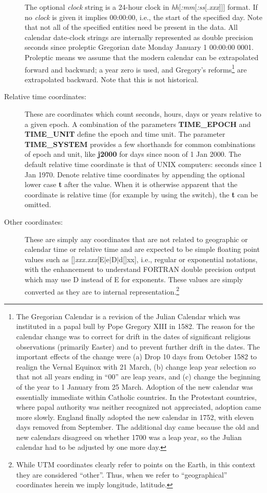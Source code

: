 \begin{description}
The optional \emph{clock} string is a 24-hour clock in \emph{hh}[\emph{:mm}[\emph{:ss}[\emph{.xxx}]]] format.
If no \emph{clock} is given
it implies 00:00:00, i.e., the start of the specified day.
Note that not all of the specified entities need be present in the data.  All calendar date-clock strings are internally represented as double precision seconds since
proleptic Gregorian date Monday January 1 00:00:00 0001.  Proleptic means we assume that the modern calendar
can be extrapolated forward and backward; a year zero is used, and Gregory's reforms\footnote{The Gregorian Calendar
is a revision of the Julian Calendar which was instituted in a papal bull by Pope Gregory XIII in 1582. The reason for the calendar
change was to correct for drift in the dates of significant religious observations (primarily Easter) and to prevent further drift
in the dates. The important effects of the change were (a) Drop 10 days from October 1582 to realign the Vernal Equinox with 21 March,
(b) change leap year selection so that not all years ending in ``00'' are leap years, and (c) change the beginning of the year to
1 January from 25 March.  Adoption of the new calendar was essentially immediate within Catholic countries. In the Protestant countries,
where papal authority was neither recognized not appreciated, adoption came more slowly.
England finally adopted the new calendar in 1752, with eleven days removed from September. The additional day came because the old and
new calendars disagreed on whether 1700 was a leap year, so the Julian calendar had to be adjusted by one more day.} are extrapolated
backward.  Note that this is not historical.

\item [Relative time coordinates:]  These are coordinates which count seconds, hours, days or years relative to a
given epoch. A combination of the parameters \textbf{TIME\_EPOCH} and
\textbf{TIME\_UNIT} define the epoch and time unit. The parameter \textbf{TIME\_SYSTEM} provides a few shorthands for common combinations
of epoch and unit, like \textbf{j2000} for days since noon of 1 Jan 2000.
The default relative time coordinate is that of UNIX computers: seconds since 1 Jan 1970.
Denote relative time coordinates by appending the optional lower case
\textbf{t} after the value.  When it is otherwise apparent that the coordinate is relative time (for example by using
the  switch), the \textbf{t} can be omitted.

\item [Other coordinates:]  These are simply any coordinates that are not related to geographic or calendar time or relative
time and are
expected to be simple floating point values such as [\PM]\emph{xxx.xxx}[E$|$e$|$D$|$d[\PM]xx], i.e., regular or exponential
notations, with the enhancement to understand FORTRAN double precision output which may use D instead of E for exponents.
These values are simply converted as they are to internal representation.\footnote{While
UTM coordinates clearly refer to points on the Earth, in this context they are considered ``other''.  Thus, when we
refer to ``geographical'' coordinates herein we imply longitude, latitude.}
\end{description}

